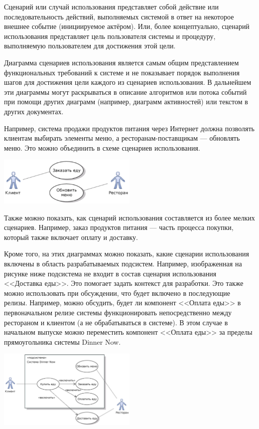 \documentclass{../../text-style}
\begin{document}
Сценарий или случай использования представляет собой действие или последовательность действий, выполняемых системой в ответ на некоторое внешнее событие (инициируемое актёром). Или, более концептуально, сценарий использования представляет цель пользователя системы и процедуру, выполняемую пользователем для достижения этой цели.

Диаграмма сценариев использования является самым общим представлением функциональных требований к системе и не показывает порядок выполнения шагов для достижения цели каждого из сценариев использования. В дальнейшем эти диаграммы могут раскрываться в описание алгоритмов или потока событий при помощи других диаграмм (например, диаграмм активностей) или текстом в других документах.

Например, система продажи продуктов питания через Интернет должна позволять клиентам выбирать элементы меню, а ресторанам-поставщикам --- обновлять меню. Это можно объединить в схеме сценариев использования.

\begin{center}
    \includegraphics[width=0.5\textwidth]{useCaseSmallExample.png}
\end{center}

Также можно показать, как сценарий использования составляется из более мелких сценариев. Например, заказ продуктов питания --- часть процесса покупки, который также включает оплату и доставку.

Кроме того, на этих диаграммах можно показать, какие сценарии использования включены в область разрабатываемых подсистем. Например, изображенная на рисунке ниже подсистема не входит в состав сценария использования <<Доставка еды>>. Это помогает задать контекст для разработки. Это также можно использовать при обсуждении, что будет включено в последующие релизы. Например, можно обсудить, будет ли компонент <<Оплата еды>> в первоначальном релизе системы функционировать непосредственно между рестораном и клиентом (а не обрабатываться в системе). В этом случае в начальном выпуске можно переместить компонент <<Оплата еды>> за пределы прямоугольника системы Dinner Now.

\begin{center}
    \includegraphics[width=0.5\textwidth]{useCaseBiggerExample.png}
\end{center}
\end{document}
